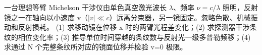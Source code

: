 一台理想等臂 Michelson 干涉仪由单色真空激光波长 \(\lambda \)、频率 \(\nu=c/\lambda\) 照明，反射镜之一在轴向以小速度 v（\(|v|\ll c\)）远离分束器，另一镜固定。忽略色散、机械振动和反射损耗。
(1) 求移动镜在位移 x 时的两臂光程差变化；(2) 求探测器干涉条纹的相位变化率；(3) 推导单位时间穿越的条纹数与反射光一级多普勒频移；(4) 求通过 N 个完整条纹所对应的镜面位移并检验 v=0 极限。
